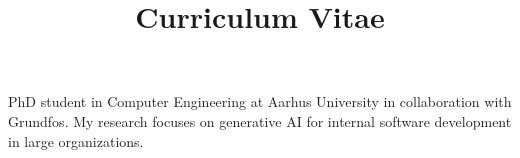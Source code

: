 \documentclass[a4paper,skipsamekey,11pt,english]{curve}
\title{Curriculum Vitae}
\begin{document}
\makeheaders[c]

\noindent PhD student in Computer Engineering at Aarhus University in collaboration with Grundfos. My research focuses on generative AI for internal software development in large organizations.




\end{document}
